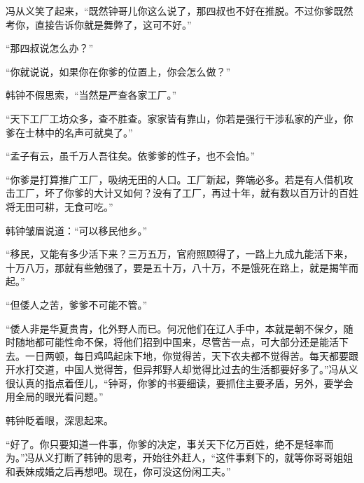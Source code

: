 冯从义笑了起来，“既然钟哥儿你这么说了，那四叔也不好在推脱。不过你爹既然考你，直接告诉你就是舞弊了，这可不好。”

“那四叔说怎么办？”

“你就说说，如果你在你爹的位置上，你会怎么做？”

韩钟不假思索，“当然是严查各家工厂。”

“天下工厂工坊众多，查不胜查。家家皆有靠山，你若是强行干涉私家的产业，你爹在士林中的名声可就臭了。”

“孟子有云，虽千万人吾往矣。依爹爹的性子，也不会怕。”

“你爹是打算推广工厂，吸纳无田的人口。工厂新起，弊端必多。若是有人借机攻击工厂，坏了你爹的大计又如何？没有了工厂，再过十年，就有数以百万计的百姓将无田可耕，无食可吃。”

韩钟皱眉说道：“可以移民他乡。”

“移民，又能有多少活下来？三万五万，官府照顾得了，一路上九成九能活下来，十万八万，那就有些勉强了，要是五十万，八十万，不是饿死在路上，就是揭竿而起。”

“但倭人之苦，爹爹不可能不管。”

“倭人非是华夏贵胄，化外野人而已。何况他们在辽人手中，本就是朝不保夕，随时随地都可能性命不保，将他们招到中国来，尽管苦一点，可大部分还是能活下去。一日两顿，每日鸡鸣起床下地，你觉得苦，天下农夫都不觉得苦。每天都要跟开水打交道，中国人觉得苦，但异邦野人却觉得比过去的生活都要好多了。”冯从义很认真的指点着侄儿，“钟哥，你爹的书要细读，要抓住主要矛盾，另外，要学会用全局的眼光看问题。”

韩钟眨着眼，深思起来。

“好了。你只要知道一件事，你爹的决定，事关天下亿万百姓，绝不是轻率而为。”冯从义打断了韩钟的思考，开始往外赶人，“这件事剩下的，就等你哥哥姐姐和表妹成婚之后再想吧。现在，你可没这份闲工夫。”

